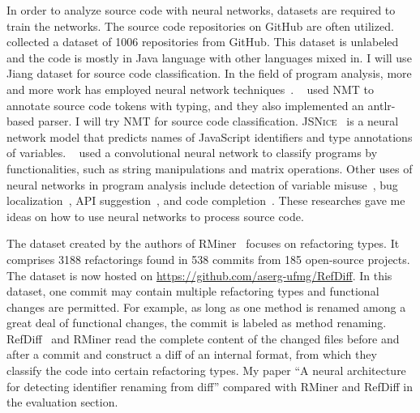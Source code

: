 In order to analyze source code with neural networks, datasets are required to train the networks. The source code repositories on GitHub are often utilized.
~\cite{jiang2017} collected a dataset of \num{1006} repositories from GitHub. This dataset is unlabeled and the code is mostly in Java language with other languages mixed in.
I will use Jiang dataset for source code classification.
In the field of program analysis, more and more work has employed neural network techniques~\cite{morgachev2019detection,huo2016learning,gu2016deep}.
~\cite{alexandru2017replicating} used NMT to annotate source code tokens with typing,
and they also implemented an {\sc antlr}-based parser.
I will try NMT for source code classification.
\textsc{JSNice}~\cite{raychev2015predicting} is a neural network model that predicts names of JavaScript identifiers and type annotations of variables.
~\cite{mou2016convolutional} used a convolutional neural network to classify programs by functionalities, such as string manipulations and matrix operations.
Other uses of neural networks in program analysis include
detection of variable misuse~\cite{morgachev2019detection},
bug localization~\cite{huo2016learning},
API suggestion~\cite{gu2016deep}, and
code completion~\cite{raychev2014code}.
These researches gave me ideas on how to use neural networks to process source code.


The dataset created by the authors of RMiner~\cite{tsantalis2018accurate} focuses on refactoring types. It comprises \num{3188} refactorings found in 538 commits from 185 open-source projects. The dataset is now hosted on \url{https://github.com/aserg-ufmg/RefDiff}. In this dataset, one commit may contain multiple refactoring types and functional changes are permitted. For example, as long as one method is renamed among a great deal of functional changes, the commit is labeled as method renaming.
RefDiff~\cite{silva2020refdiff} and RMiner read the complete content of the changed files before and after a commit and construct a diff of an internal format, from which they classify the code into certain refactoring types.
My paper ``A neural architecture for detecting identifier renaming from diff'' compared with RMiner and RefDiff in the evaluation section.





